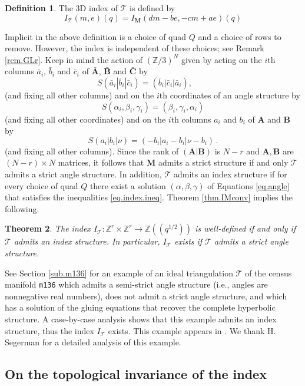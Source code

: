 \documentclass[12pt]{amsart}
\newtheorem{theorem}{Theorem}[section]
\theoremstyle{definition}
\newtheorem{definition}[theorem]{Definition}
\def\BZ{\mathbb Z}
\def\calT{\mathcal T}
\def\a{\alpha}
\def\ga{\gamma}
\def\b{\beta}
\def\longto{\longrightarrow}
\def\be{  \begin{equation} }
\def\ee{  \end{equation} }
\newcommand{\mb}{\mathbf}
\numberwithin{equation}{section}
\begin{document}
\begin{definition}
\label{def.indexT}
The 3D index of $\calT$ is defined by  
\be
\label{eq.index2}
I_{\calT}(m,e)(q)=I_{\mb M}(d m - b e, -c m + a e)(q)
\ee
\end{definition}
Implicit in the above definition is a choice of quad $Q$ and a choice
of rows to remove. However, the index is independent of these choices;
see Remark \ref{rem.GLr}. Keep in mind the action of $(\BZ/3)^N$ given by
acting on the $i$th columns $\bar a_i$, $\bar b_i$ and $\bar c_i$
of $\bar{\mb A}$, $\bar{\mb B}$ and $\bar{\mb C}$ by 
$$
S(\bar a_i |\bar b_i |\bar c_i)=(\bar b_i |\bar c_i |\bar a_i), \qquad
$$
(and fixing all other columns) and on the $i$th coordinates of an angle 
structure by
$$
S(\a_i,\b_i,\ga_i)=(\b_i,\ga_i,\a_i)
$$
(and fixing all other coordinates) 
and on the $i$th columns $a_i$ and $b_i$ of $\mb A$ and $\mb B$ by
$$
S(a_i|b_i|\nu)=(-b_i |a_i-b_i|\nu-b_i) \,.
$$
(and fixing all other columns). Since the rank of $(\mb A|\mb B)$ is $N-r$
and $\mb A, \mb B$ are $(N-r)\times N$ matrices, it follows that $\mb M$
admits a strict structure if and only $\calT$ admits a strict
angle structure. In addition, $\calT$ admits an index structure if for every
choice of quad $Q$ there exist a solution $(\a,\b,\ga)$ of Equations
\eqref{eq.angle} that satisfies the inequalities \eqref{eq.index.ineq}.
Theorem \ref{thm.IMconv} implies the following.

\begin{theorem}
\label{thm.3}
The index $I_{\calT}: \BZ^r \times \BZ^r \longto \BZ((q^{1/2}))$
is well-defined if and only if $\calT$ admits an index structure. In particular,
$I_{\calT}$ exists if $\calT$ admits a strict angle structure.
\end{theorem}

See Section \ref{sub.m136} for an example of an ideal triangulation $\calT$ of
the census manifold {\tt m136} \cite{census} which admits a semi-strict 
angle structure (i.e., angles are nonnegative real numbers), does not
admit a strict angle structure, and which has a solution of the gluing 
equations that recover the complete hyperbolic structure. A case-by-case
analysis shows that this example admits an index structure, thus the index
$I_{\calT}$ exists. This example
appears in \cite[Example 7.7]{HRS}. We thank H. Segerman for a detailed
analysis of this example. 

\subsection{On the topological invariance of the index}
\label{sub.invariance}
\end{document}
